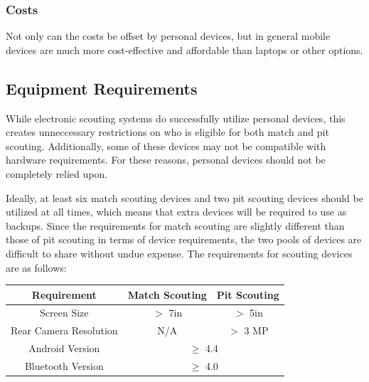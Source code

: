 \documentclass[11pt]{report}
\begin{document}
\subsubsection*{Costs}

Not only can the costs be offset by personal devices, but in general mobile devices are much more cost-effective and affordable than laptops or other options.

\subsection{Equipment Requirements}

While electronic scouting systems do successfully utilize personal devices, this creates unneccessary restrictions on who is eligible for both match and pit scouting. Additionally, some of these devices may not be compatible with hardware requirements. For these reasons, personal devices should not be completely relied upon. \newline

Ideally, at least six match scouting devices and two pit scouting devices should be utilized at all times, which means that extra devices will be required to use as backups. Since the requirements for match scouting are slightly different than those of pit scouting in terms of device requirements, the two pools of devices are difficult to share without undue expense. The requirements for scouting devices are as follows: 

\begin{center}
 \begin{tabular}{||c|c|c||} 
 \hline
 Requirement & Match Scouting & Pit Scouting \\  [0.5ex] 
 \hline \hline
 Screen Size & $>$ 7in & $>$ 5in \\ 
 \hline
 Rear Camera Resolution & N/A & $>$ 3 MP \\ 
 \hline
 Android Version & \multicolumn{2}{|c||}{$\geq$ 4.4}  \\
 \hline
 Bluetooth Version & \multicolumn{2}{|c||}{$\geq$ 4.0} \\  [1ex] 
 \hline
\end{tabular}
\end{center}
\end{document}
